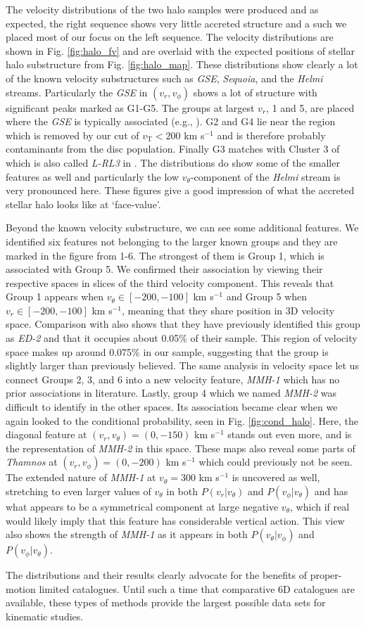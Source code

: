 The velocity distributions of the two halo samples were produced and as expected, the right sequence shows very little accreted structure and a such we placed most of our focus on the left sequence. The velocity distributions are shown in Fig. \ref{fig:halo_fv} and are overlaid with the expected positions of stellar halo substructure from Fig. \ref{fig:halo_map}. These distributions show clearly a lot of the known velocity substructures such as \textit{GSE}, \textit{Sequoia}, and the \textit{Helmi} streams. Particularly the \textit{GSE} in $(v_r, v_\phi)$ shows a lot of structure with significant peaks marked as G1-G5. The groups at largest $v_r$, 1 and 5, are placed where the \textit{GSE} is typically associated (e.g., \citealt{feuillet:21}). G2 and G4 lie near the region which is removed by our cut of $v_\mathrm{T} < 200$ km s$^{-1}$ and is therefore probably contaminants from  the disc population. Finally G3 matches with Cluster 3 of \cite{lovdal:22} which is also called \textit{L-RL3} in \cite{dodd:22}. The distributions do show some of the smaller features as well and particularly the low $v_\theta$-component of the \textit{Helmi} stream is very pronounced here. These figures give a good impression of what the accreted stellar halo looks like at `face-value'.

Beyond the known velocity substructure, we can see some additional features. We identified six features not belonging to the larger known groups and they are marked in the figure from 1-6. The strongest of them is Group 1, which is associated with Group 5. We confirmed their association by viewing their respective spaces in slices of the third velocity component. This reveals that Group 1 appears when $v_\theta \in [-200, -100]$ km s$^{-1}$ and Group 5 when $v_r \in [-200, -100]$ km s$^{-1}$, meaning that they share position in 3D velocity space. Comparison with \cite{dodd:22} also shows that they have previously identified this group as \textit{ED-2} and that it occupies about 0.05\% of their sample. This region of velocity space makes up around 0.075\% in our sample, suggesting that the group is slightly larger than previously believed. The same analysis in velocity space let us connect Groups 2, 3, and 6 into a new velocity feature, \textit{MMH-1} which has no prior associations in literature. Lastly, group 4 which we named \textit{MMH-2} was difficult to identify in the other spaces. Its association became clear when we again looked to the conditional probability, seen in Fig. \ref{fig:cond_halo}. Here, the diagonal feature at $(v_r, v_\theta) = (0, -150)$ km s$^{-1}$ stands out even more, and is the representation of \textit{MMH-2} in this space. These maps also reveal some parts of \textit{Thamnos} at $(v_r, v_\phi) = (0, -200)$ km s$^{-1}$ which could previously not be seen. The extended nature of \textit{MMH-1} at $v_\theta = 300$ km s$^{-1}$ is uncovered as well, stretching to even larger values of $v_\theta$ in both $P(v_r|v_\theta)$ and $P(v_\phi|v_\theta)$ and has what appears to be a symmetrical component at large negative $v_\theta$, which if real would likely imply that this feature has considerable vertical action. This view also shows the strength of \textit{MMH-1} as it appears in both $P(v_\theta|v_\phi)$ and $P(v_\phi|v_\theta)$.

The distributions and their results clearly advocate for the benefits of proper-motion limited catalogues. Until such a time that comparative 6D catalogues are available, these types of methods provide the largest possible data sets for kinematic studies. 

